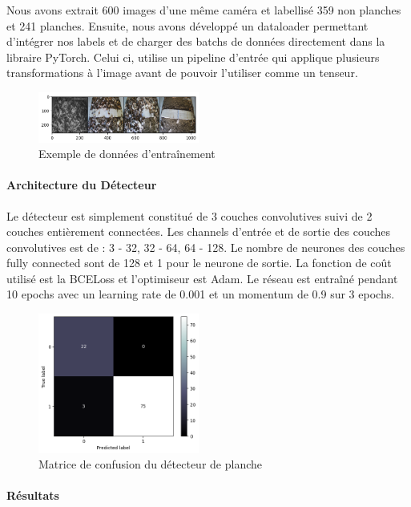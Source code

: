 Nous avons extrait 600 images d'une même caméra et labellisé 359 non planches et 241 planches. Ensuite, nous avons développé un dataloader permettant d'intégrer nos labels et de charger des batchs de données directement dans la libraire PyTorch. Celui ci, utilise un pipeline d'entrée qui applique plusieurs transformations à l'image avant de pouvoir l'utiliser comme un tenseur.

\begin{figure}[!htb]
    \centering
    \includegraphics[width=200px]{images/filtre_exemple_data}
    \caption{Exemple de données d'entraînement}
    \label{fig:Entraînement du filtre}
\end{figure}

\paragraph*{Architecture du Détecteur}

Le détecteur est simplement constitué de 3 couches convolutives suivi de 2 couches entièrement connectées. Les channels d'entrée et de sortie des couches convolutives est de : 3 - 32, 32 - 64, 64 - 128. Le nombre de neurones des couches fully connected sont de 128 et 1 pour le neurone de sortie. La fonction de coût utilisé est la BCELoss et l'optimiseur est Adam. Le réseau est entraîné pendant 10 epochs avec un learning rate de 0.001 et un momentum de 0.9 sur 3 epochs.

\begin{figure}[!htb]
    \centering
    \includegraphics[width=200px]{images/filtre_cmatrix}
    \caption{Matrice de confusion du détecteur de planche}
    \label{fig:Matrice de confusion du filtre}
\end{figure}

\paragraph*{Résultats}

